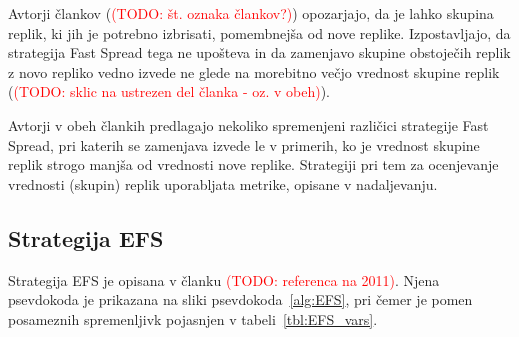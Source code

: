 \documentclass[a4paper, 12pt]{book}
\newcommand{\TODO}[1]{\textcolor{red}{(TODO: #1)}}
\begin{document}
Avtorji člankov (\TODO{št. oznaka člankov?}) opozarjajo, da je lahko
skupina replik, ki jih je potrebno izbrisati, pomembnejša od
nove replike. Izpostavljajo, da strategija Fast Spread tega ne upošteva in
da zamenjavo skupine obstoječih replik z novo repliko vedno
izvede ne glede na morebitno večjo vrednost skupine replik
(\TODO{sklic na ustrezen del članka - oz. v obeh}).

Avtorji v obeh člankih predlagajo nekoliko spremenjeni različici strategije
Fast Spread, pri katerih se zamenjava izvede le v primerih, ko je vrednost
skupine replik strogo manjša od vrednosti nove replike. Strategiji pri tem
za ocenjevanje vrednosti (skupin) replik uporabljata metrike, opisane v
nadaljevanju.

\subsection{Strategija EFS}

Strategija EFS je opisana v članku \TODO{referenca na 2011}. Njena psevdokoda
je prikazana na sliki psevdokoda~\ref{alg:EFS}, pri čemer
je pomen posameznih spremenljivk pojasnjen v tabeli~\ref{tbl:EFS_vars}.
\end{document}
